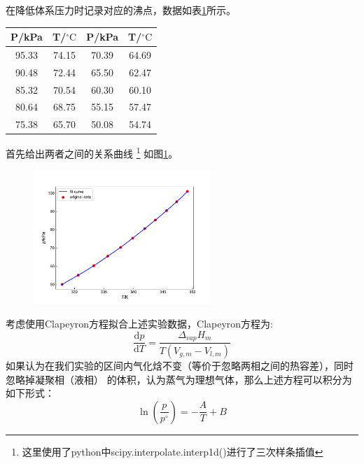 \documentclass[12pt]{article}
\def\d{\mathrm{d}}  %
\newcommand{\mr}[1]{\mathrm{#1}}
\newcommand{\dv}[2]{\frac{\d{#1}}{\d{#2}}}  %
\def\celsius{^{\circ}\mr{C}}  %
\begin{document}
		在降低体系压力时记录对应的沸点，数据如表\ref{static CCl4}所示。
		\begin{table}[h]
			\centering
			\begin{tabular}{cccc}
				\toprule
				P/kPa & T/$\celsius$ & P/kPa & T/$\celsius$\\
				\midrule
				95.33 & 74.15 & 70.39 & 64.69 \\
				90.48 & 72.44 & 65.50 & 62.47 \\
				85.32 & 70.54 & 60.30 & 60.10 \\
				80.64 & 68.75 & 55.15 & 57.47 \\
				75.38 & 65.70 & 50.08 & 54.74 \\
				\bottomrule
			\end{tabular}
			\label{static CCl4}
		\end{table}
		\par
		首先给出两者之间的关系曲线
		\footnote{
			这里使用了python中scipy.interpolate.interp1d()进行了三次样条插值
		}
		如图\ref{P-T spline of CCl4}。
		\begin{figure}[h]
			\centering
			\includegraphics[width=0.6\textwidth]{CCl4_spline.pdf}
			\label{P-T spline of CCl4}
		\end{figure}
		\par 
		考虑使用Clapeyron方程拟合上述实验数据，Clapeyron方程为:
		\begin{equation}
			\dv{p}{T} = \dfrac{\Delta_{vap}H_{m}}{T(V_{g, m} - V_{l, m})}
		\end{equation}
		如果认为在我们实验的区间内气化焓不变（等价于忽略两相之间的热容差），同时忽略掉凝聚相（液相）
		的体积，认为蒸气为理想气体，那么上述方程可以积分为如下形式：
		\begin{equation}
			\ln\left(\dfrac{p}{p^{\circ}}\right) = -\dfrac{A}{T} + B
		\end{equation}
\end{document}
